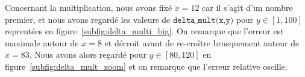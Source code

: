 \documentclass{article}
\begin{document}
Concernant la multiplication, nous avons fixé $x = 12$ car il s'agit d'un nombre premier, et nous avons regardé les valeurs de $\texttt{delta\_mult(x,y)}$ pour $y\in[1,100]$ reprentées en figure~\ref{subfig:delta_multi_big}. On remarque que l'erreur est maximale autour de $x = 8$ et décroit avant de re-croître brusquement autour de $x = 83$. Nous avons alors regardé pour $y\in[80,120]$ en figure~\ref{subfig:delta_mult_zoom} et on remarque que l'erreur relative oscille.
 



  




  
 



  




  
 



  
\end{document}
